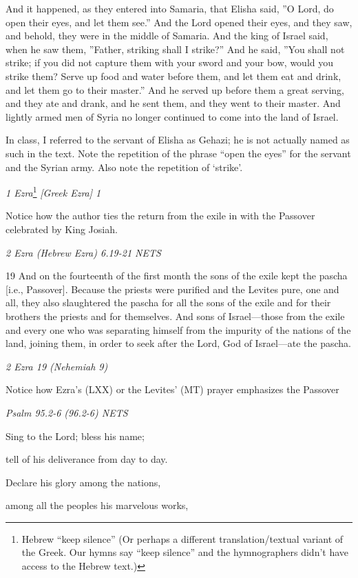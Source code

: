 \documentclass[
]{article}
\newcommand{\RL}[1]{\beginR #1\endR}
\begin{document}
And it happened, as they entered into Samaria, that Elisha said,
\RL{''}O Lord, do open their eyes, and let them see.'' And the Lord
opened their eyes, and they saw, and behold, they were in the middle of
Samaria. And the king of Israel said, when he saw them, \RL{''}Father,
striking shall I strike?'' And he said, \RL{''}You shall not strike; if
you did not capture them with your sword and your bow, would you strike
them? Serve up food and water before them, and let them eat and drink,
and let them go to their master.'' And he served up before them a great
serving, and they ate and drank, and he sent them, and they went to
their master. And lightly armed men of Syria no longer continued to come
into the land of Israel.

In class, I referred to the servant of Elisha as Gehazi; he is not
actually named as such in the text. Note the repetition of the phrase
``open the eyes'' for the servant and the Syrian army. Also note the
repetition of `strike'.

\emph{1 Ezra}\footnote{Hebrew ``keep silence'' (Or perhaps a different
  translation/textual variant of the Greek. Our hymns say ``keep
  silence'' and the hymnographers didn't have access to the Hebrew
  text.)} \emph{{[}Greek Ezra{]} 1}

Notice how the author ties the return from the exile in with the
Passover celebrated by King Josiah.

\emph{2 Ezra (Hebrew Ezra) 6.19-21 NETS}

19 And on the fourteenth of the first month the sons of the exile kept
the pascha {[}i.e., Passover{]}. Because the priests were purified and
the Levites pure, one and all, they also slaughtered the pascha for all
the sons of the exile and for their brothers the priests and for
themselves. And sons of Israel---those from the exile and every one who
was separating himself from the impurity of the nations of the land,
joining them, in order to seek after the Lord, God of Israel---ate the
pascha.

\emph{2 Ezra 19 (Nehemiah 9)}

Notice how Ezra's (LXX) or the Levites' (MT) prayer emphasizes the
Passover

\emph{Psalm 95.2-6 (96.2-6) NETS}

Sing to the Lord; bless his name;

tell of his deliverance from day to day.

Declare his glory among the nations,

among all the peoples his marvelous works,
\end{document}
